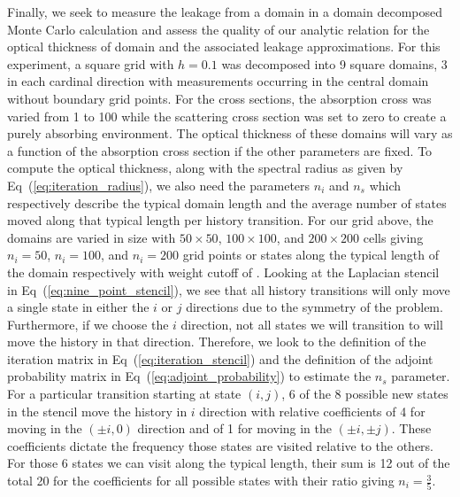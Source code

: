 \documentclass{mc2013}
\begin{document}
\label{subsec:domain_leakage}

Finally, we seek to measure the leakage from a domain in a domain
decomposed Monte Carlo calculation and assess the quality of our
analytic relation for the optical thickness of domain and the
associated leakage approximations. For this experiment, a square grid
with $h=0.1$ was decomposed into 9 square domains, 3 in each cardinal
direction with measurements occurring in the central domain without
boundary grid points. For the cross sections, the absorption cross was
varied from 1 to 100 while the scattering cross section was set to
zero to create a purely absorbing environment. The optical thickness
of these domains will vary as a function of the absorption cross
section if the other parameters are fixed. To compute the optical
thickness, along with the spectral radius as given by
Eq~(\ref{eq:iteration_radius}), we also need the parameters $n_i$ and
$n_s$ which respectively describe the typical domain length and the
average number of states moved along that typical length per history
transition. For our grid above, the domains are varied in size with
$50 \times 50$, $100 \times 100$, and $200 \times 200$ cells giving
$n_i=50$, $n_i=100$, and $n_i=200$ grid points or states along the
typical length of the domain respectively with weight cutoff of
. Looking at the Laplacian stencil in
Eq~(\ref{eq:nine_point_stencil}), we see that all history transitions
will only move a single state in either the $i$ or $j$ directions due
to the symmetry of the problem. Furthermore, if we choose the $i$
direction, not all states we will transition to will move the history
in that direction. Therefore, we look to the definition of the
iteration matrix in Eq~(\ref{eq:iteration_stencil}) and the definition
of the adjoint probability matrix in Eq~(\ref{eq:adjoint_probability})
to estimate the $n_s$ parameter. For a particular transition starting
at state $(i,j)$, 6 of the 8 possible new states in the stencil move
the history in $i$ direction with relative coefficients of 4 for
moving in the $(\pm i,0)$ direction and of 1 for moving in the $(\pm
i,\pm j)$. These coefficients dictate the frequency those states are
visited relative to the others. For those 6 states we can visit along
the typical length, their sum is 12 out of the total 20 for the
coefficients for all possible states with their ratio giving $n_i =
\frac{3}{5}$.
\end{document}

